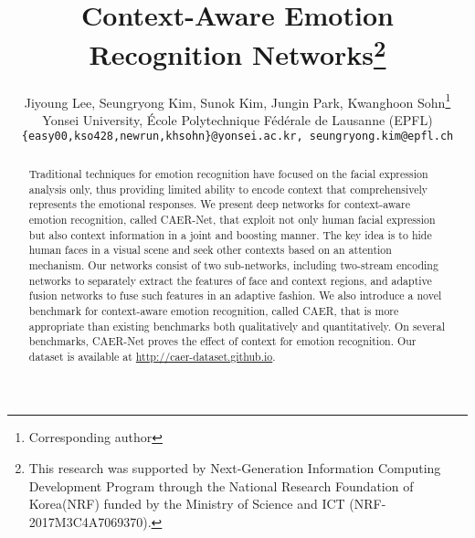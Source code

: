 \documentclass[10pt,twocolumn,letterpaper]{article}
\begin{document}
\title{Context-Aware Emotion Recognition Networks\thanks{This research was supported by Next-Generation Information Computing Development Program through the National Research Foundation of Korea(NRF) funded by the Ministry of Science and ICT (NRF-2017M3C4A7069370).}}
\author{
	Jiyoung Lee, Seungryong Kim, Sunok Kim, Jungin Park, Kwanghoon Sohn\thanks{Corresponding author}\\
	Yonsei University, \'Ecole Polytechnique F\'ed\'erale de Lausanne (EPFL)\\
	{\tt\small \{easy00,kso428,newrun,khsohn\}@yonsei.ac.kr, seungryong.kim@epfl.ch}\\
}

\maketitle
\ificcvfinal\thispagestyle{empty}\fi


\begin{abstract}
Traditional techniques for emotion recognition have focused on the facial expression analysis only, thus providing limited ability to encode context that comprehensively represents the emotional responses.
We present deep networks for context-aware emotion recognition, called CAER-Net, that exploit not only human facial expression but also context information in a joint and boosting manner.
The key idea is to hide human faces in a visual scene and seek other contexts based on an attention mechanism. Our networks consist of two sub-networks, including two-stream encoding networks to separately extract the features of face and context regions, and adaptive fusion networks to fuse such features in an adaptive fashion. We also introduce a novel benchmark for context-aware emotion recognition, called CAER, that is more appropriate than existing benchmarks both qualitatively and quantitatively.
On several benchmarks, CAER-Net proves the effect of context for emotion recognition.
Our dataset is available at \small{\url{http://caer-dataset.github.io}}.
\end{abstract}
\end{document}
